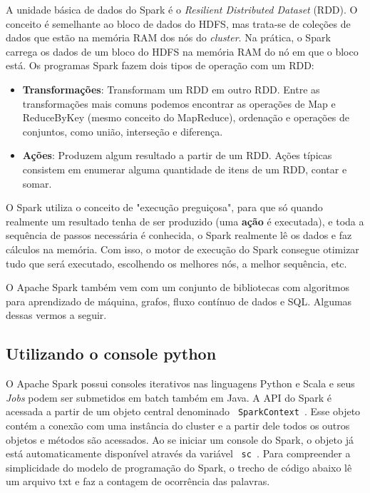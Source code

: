 A unidade básica de dados do Spark é o \textit{Resilient Distributed Dataset} (RDD). O conceito é semelhante ao bloco de dados do HDFS, mas trata-se de coleções de dados que estão na memória RAM dos nós do \textit{cluster}. Na prática, o Spark carrega os dados de um bloco do HDFS na memória RAM do nó em que o bloco está. Os programas Spark fazem dois tipos de operação com um RDD:
\begin{itemize}
	\item \textbf{Transformações}: Transformam um RDD em outro RDD. Entre as transformações mais comuns podemos encontrar as operações de Map e ReduceByKey (mesmo conceito do MapReduce), ordenação e operações de conjuntos, como união, interseção e diferença.
	\item \textbf{Ações}: Produzem algum resultado a partir de um RDD. Ações típicas consistem em enumerar alguma quantidade de itens de um RDD, contar e somar. 
\end{itemize}

O Spark utiliza o conceito de "execução preguiçosa", para que só quando realmente um resultado tenha de ser produzido (uma \textbf{ação} é executada), e toda a sequência de passos necessária é conhecida, o Spark realmente lê os dados e faz cálculos na memória. Com isso, o motor de execução do Spark consegue otimizar tudo que será executado, escolhendo os melhores nós, a melhor sequência, etc.

O Apache Spark também vem com um conjunto de bibliotecas com algoritmos para aprendizado de máquina, grafos, fluxo contínuo de dados e SQL. Algumas dessas vermos a seguir.

\subsection{Utilizando o console python}
O Apache Spark possui consoles iterativos nas linguagens Python e Scala e seus \textit{Jobs} podem ser submetidos em batch também em Java. A API do Spark é acessada a partir de um objeto central denominado \texttt{ SparkContext }. Esse objeto contém a conexão com uma instância do cluster e a partir dele todos os outros objetos e métodos são acessados. Ao se iniciar um console do Spark, o objeto já está automaticamente disponível através da variável \texttt{ sc }. Para compreender a simplicidade do modelo de programação do Spark, o trecho de código abaixo lê um arquivo txt e faz a contagem de ocorrência das palavras.

